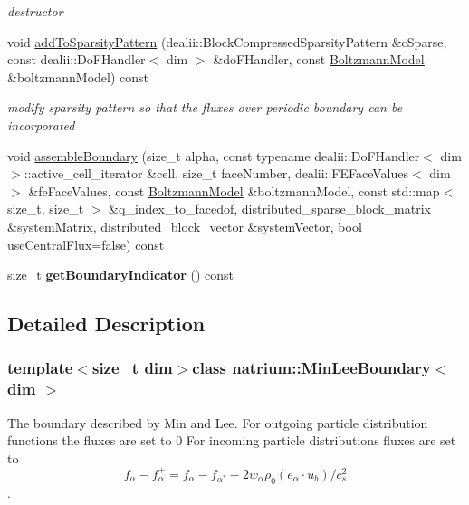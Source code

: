 \begin{DoxyCompactItemize}
\begin{DoxyCompactList}\small\item\em destructor \end{DoxyCompactList}\item 
void \hyperlink{classnatrium_1_1MinLeeBoundary_a873e55801ae7972803d50c7fb805c391}{add\-To\-Sparsity\-Pattern} (dealii\-::\-Block\-Compressed\-Sparsity\-Pattern \&c\-Sparse, const dealii\-::\-Do\-F\-Handler$<$ dim $>$ \&do\-F\-Handler, const \hyperlink{classnatrium_1_1BoltzmannModel}{Boltzmann\-Model} \&boltzmann\-Model) const 
\begin{DoxyCompactList}\small\item\em modify sparsity pattern so that the fluxes over periodic boundary can be incorporated \end{DoxyCompactList}\item 
void \hyperlink{classnatrium_1_1MinLeeBoundary_ad23ea2da1a52b6550419eb504aa611ab}{assemble\-Boundary} (size\-\_\-t alpha, const typename dealii\-::\-Do\-F\-Handler$<$ dim $>$\-::active\-\_\-cell\-\_\-iterator \&cell, size\-\_\-t face\-Number, dealii\-::\-F\-E\-Face\-Values$<$ dim $>$ \&fe\-Face\-Values, const \hyperlink{classnatrium_1_1BoltzmannModel}{Boltzmann\-Model} \&boltzmann\-Model, const std\-::map$<$ size\-\_\-t, size\-\_\-t $>$ \&q\-\_\-index\-\_\-to\-\_\-facedof, distributed\-\_\-sparse\-\_\-block\-\_\-matrix \&system\-Matrix, distributed\-\_\-block\-\_\-vector \&system\-Vector, bool use\-Central\-Flux=false) const 
\item 
\hypertarget{classnatrium_1_1MinLeeBoundary_a050f00caec37ee8e2f6e19a4d3d2d1fc}{size\-\_\-t {\bfseries get\-Boundary\-Indicator} () const }\label{classnatrium_1_1MinLeeBoundary_a050f00caec37ee8e2f6e19a4d3d2d1fc}

\end{DoxyCompactItemize}


\subsection{Detailed Description}
\subsubsection*{template$<$size\-\_\-t dim$>$class natrium\-::\-Min\-Lee\-Boundary$<$ dim $>$}

The boundary described by Min and Lee. For outgoing particle distribution functions the fluxes are set to 0 For incoming particle distributions fluxes are set to \[ f_{\alpha} - f^{+}_{\alpha} = f_{\alpha} - f_{\alpha^{*}} - 2w_{\alpha} \rho_{0} (e_{\alpha}\cdot u_{b})/c^{2}_{s}\]. 

